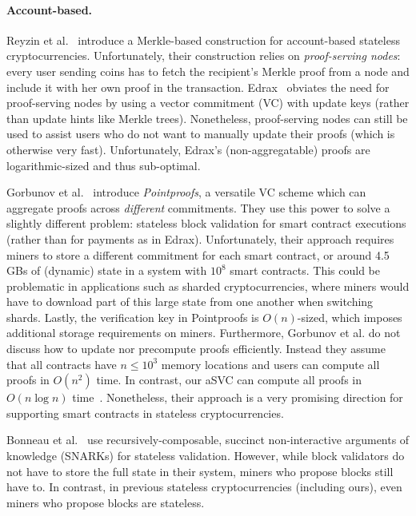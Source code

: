 \ifNotCameraReady\paragraph{Account-based.}\fi
Reyzin et al.~\cite{RMCI17} introduce a Merkle-based construction for account-based stateless cryptocurrencies.
Unfortunately, their construction relies on \textit{proof-serving nodes}: every user sending coins has to fetch the recipient's Merkle proof from a node and include it with her own proof in the transaction.
Edrax~\cite{CPZ18} obviates the need for proof-serving nodes by using a vector commitment (VC) with update keys (rather than update hints like Merkle trees).
Nonetheless, proof-serving nodes can still be used to assist users who do not want to manually update their proofs (which is otherwise very fast).
Unfortunately, Edrax's (non-aggregatable) proofs are logarithmic-sized and thus sub-optimal.

Gorbunov et al.~\cite{GRWZ20} introduce \textit{Pointproofs}, a versatile VC scheme which can aggregate proofs across \textit{different} commitments.
They use this power to solve a slightly different problem: stateless block validation for smart contract executions (rather than for payments as in Edrax).
Unfortunately, their approach requires miners to store a different commitment for each smart contract, or around 4.5 GBs of (dynamic) state in a system with $10^8$ smart contracts.
This could be problematic in applications such as sharded cryptocurrencies, where miners would have to download part of this large state from one another when switching shards.
Lastly, the verification key in Pointproofs is $O(n)$-sized, which imposes additional storage requirements on miners.
Furthermore, Gorbunov et al. do not discuss how to update nor precompute proofs efficiently.
Instead they assume that all contracts have $n\le 10^3$ memory locations and users can compute all proofs in $O(n^2)$ time.
In contrast, our aSVC can compute all proofs in $O(n\log{n})$ time~\cite{FK20}.
Nonetheless, their approach is a very promising direction for supporting smart contracts in stateless cryptocurrencies.

Bonneau et al.~\cite{BMRS20} use recursively-composable, succinct non-interactive arguments of knowledge (SNARKs) \cite{BCTV14} for stateless validation.
However, while block validators do not have to store the full state in their system, miners who propose blocks still have to.
\ifNotCameraReady
In contrast, in previous stateless cryptocurrencies (including ours), even miners who propose blocks are stateless.
\fi
